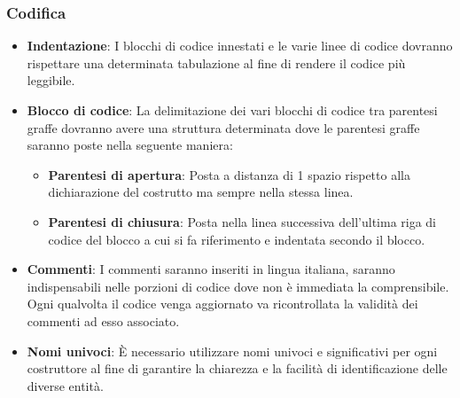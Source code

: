 \subsubsection{Codifica}
\begin{itemize}
    \item \textbf{Indentazione}: I blocchi di codice innestati e le varie linee di codice dovranno rispettare una determinata tabulazione al fine di rendere il codice più leggibile.
    \item \textbf{Blocco di codice}: La delimitazione dei vari blocchi di codice tra parentesi graffe dovranno avere una struttura determinata dove le parentesi 
    graffe saranno poste nella seguente maniera:
    \begin{itemize}
        \item \textbf{Parentesi di apertura}: Posta a distanza di 1 spazio rispetto alla dichiarazione del costrutto ma sempre nella stessa linea.
        \item \textbf{Parentesi di chiusura}: Posta nella linea successiva dell’ultima riga di codice del blocco a cui si fa riferimento e indentata secondo il blocco. 
    \end{itemize}
    \item \textbf{Commenti}: I commenti saranno inseriti in lingua italiana, saranno indispensabili nelle porzioni di codice dove non è immediata la comprensibile. Ogni qualvolta il codice 
    venga aggiornato va ricontrollata la validità dei commenti ad esso associato.
    \item \textbf{Nomi univoci}: È necessario utilizzare nomi univoci e significativi per ogni costruttore al fine di garantire la chiarezza e la facilità di identificazione delle diverse entità.
\end{itemize}









